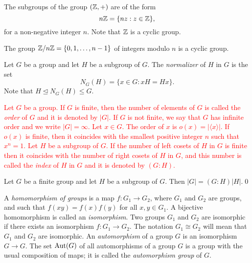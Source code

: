 \begin{example}
	The subgroups of the group $(\mathbb{Z},+)$ are of the form
	\[
	n\mathbb{Z}=\{ nz: z\in\mathbb{Z}\},
	\]
	for a non-negative integer $n$. Note that $\mathbb{Z}$ is a cyclic group.  
\end{example} 

\begin{example}
The group $\mathbb{Z}/n\mathbb{Z}=\{0,1,\dots,n-1\}$ of integers modulo $n$ is a cyclic group.
\end{example}

\begin{example} 
Let $G$ be a group and let $H$ be a subgroup of $G$. 
The \emph{normalizer} of $H$ in $G$ is the set
	\[
	N_G(H)=\{ x\in G: xH=Hx\}.
	\]
	Note that $H\unlhd N_G(H)\leq G$.
\end{example}

\textcolor{red}{Let $G$ be a group. If $G$ is finite, then the number of elements of $G$ is called the {\em order} of $G$ and it is denoted by $|G|$. If $G$ is not finite, we say that $G$ has infinite order and we write $|G|=\infty$. Let $x\in G$. The order of $x$ is $o(x)=|\langle x\rangle |$. If $o(x)$ is finite, then it coincides with the smallest positive integer $n$ such that $x^n=1$.  Let $H$ be a subgroup of $G$. If the number of left cosets of $H$ in $G$ is finite then it coincides with the number of right cosets of $H$ in $G$, and this number is called the {\em index} 
of $H$ in $G$ and it is denoted by $(G:H)$.}

\begin{theorem}
Let $G$ be a finite group and let $H$ be a subgroup of $G$. 
Then $|G|=(G:H)|H|$.\qed
\end{theorem}

A {\em homomorphism of groups} is a map $f\colon G_1\rightarrow G_2$, where $G_1$ and $G_2$ 
are groups, and such that $f(xy)=f(x)f(y)$ for all $x,y\in G_1$. A bijective homomorphism is called an {\em isomorphism}. Two groups $G_1$ and $G_2$ are isomorphic if there exists an isomorphism $f\colon G_1\rightarrow G_2$. The notation $G_1\cong G_2$ will mean that $G_1$ and $G_2$ are isomorphic. 
An {\em automorphism} of a group $G$ is an isomorphism $G\to G$. The set $\operatorname{Aut}(G)$ of all automorphisms of a group $G$ is a group with the usual 
composition of maps; it is called the {\em automorphism group} of $G$.

